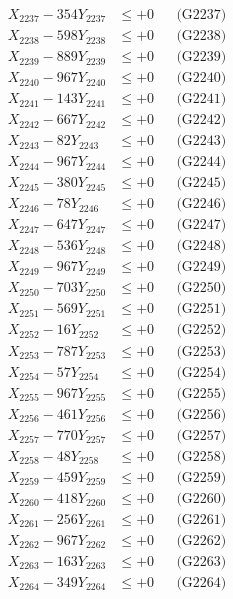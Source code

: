 \documentclass[a4paper,10pt]{article}
\begin{document}
{\begin{align}
X_{2237} - 354Y_{2237} &\leq +0 && \text{(G2237)} \\
X_{2238} - 598Y_{2238} &\leq +0 && \text{(G2238)} \\
X_{2239} - 889Y_{2239} &\leq +0 && \text{(G2239)} \\
X_{2240} - 967Y_{2240} &\leq +0 && \text{(G2240)} \\
\allowbreak
X_{2241} - 143Y_{2241} &\leq +0 && \text{(G2241)} \\
X_{2242} - 667Y_{2242} &\leq +0 && \text{(G2242)} \\
X_{2243} - 82Y_{2243} &\leq +0 && \text{(G2243)} \\
X_{2244} - 967Y_{2244} &\leq +0 && \text{(G2244)} \\
X_{2245} - 380Y_{2245} &\leq +0 && \text{(G2245)} \\
X_{2246} - 78Y_{2246} &\leq +0 && \text{(G2246)} \\
X_{2247} - 647Y_{2247} &\leq +0 && \text{(G2247)} \\
X_{2248} - 536Y_{2248} &\leq +0 && \text{(G2248)} \\
X_{2249} - 967Y_{2249} &\leq +0 && \text{(G2249)} \\
X_{2250} - 703Y_{2250} &\leq +0 && \text{(G2250)} \\
\allowbreak
X_{2251} - 569Y_{2251} &\leq +0 && \text{(G2251)} \\
X_{2252} - 16Y_{2252} &\leq +0 && \text{(G2252)} \\
X_{2253} - 787Y_{2253} &\leq +0 && \text{(G2253)} \\
X_{2254} - 57Y_{2254} &\leq +0 && \text{(G2254)} \\
X_{2255} - 967Y_{2255} &\leq +0 && \text{(G2255)} \\
X_{2256} - 461Y_{2256} &\leq +0 && \text{(G2256)} \\
X_{2257} - 770Y_{2257} &\leq +0 && \text{(G2257)} \\
X_{2258} - 48Y_{2258} &\leq +0 && \text{(G2258)} \\
X_{2259} - 459Y_{2259} &\leq +0 && \text{(G2259)} \\
X_{2260} - 418Y_{2260} &\leq +0 && \text{(G2260)} \\
\allowbreak
X_{2261} - 256Y_{2261} &\leq +0 && \text{(G2261)} \\
X_{2262} - 967Y_{2262} &\leq +0 && \text{(G2262)} \\
X_{2263} - 163Y_{2263} &\leq +0 && \text{(G2263)} \\
X_{2264} - 349Y_{2264} &\leq +0 && \text{(G2264)} \\

\end{align}}
\end{document}
